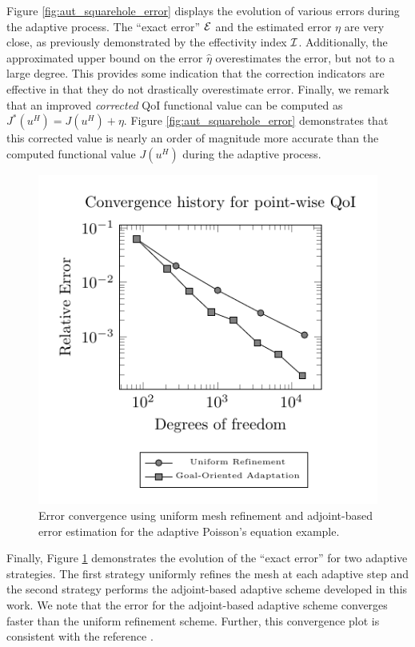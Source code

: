 Figure \ref{fig:aut_squarehole_error} displays the evolution of
various errors during the adaptive process. The ``exact error'' $\mathcal{E}$
and the estimated error $\eta$ are very close, as previously
demonstrated by the effectivity index $\mathcal{I}$. Additionally, the
approximated upper bound on the error $\hat{\eta}$ overestimates
the error, but not to a large degree. This provides some indication
that the correction indicators are effective in that they do
not drastically overestimate error. Finally, we remark that an
improved \emph{corrected} QoI functional value can be
computed as $J^*(u^H) = J(u^H) + \eta$. Figure
\ref{fig:aut_squarehole_error} demonstrates that this corrected
value is nearly an order of magnitude more accurate than
the computed functional value $J(u^H)$ during the adaptive process.

%
\begin{figure}[ht!]
\centering
\includegraphics[width=.75\textwidth]{img/aut_squarehole_convergence.pdf}
\caption{Error convergence using uniform mesh refinement and adjoint-based
error estimation for the adaptive Poisson's equation example.}
\label{fig:aut_squarehole_convergence}
\end{figure}

Finally, Figure \ref{fig:aut_squarehole_convergence} demonstrates the
evolution of the ``exact error'' for two adaptive strategies.
The first strategy uniformly refines the mesh at each adaptive
step and the second strategy performs the adjoint-based adaptive scheme
developed in this work. We note that the error for the adjoint-based
adaptive scheme converges faster than the uniform refinement scheme.
Further, this convergence plot is consistent with the reference
\cite{dealiistep14}. 

